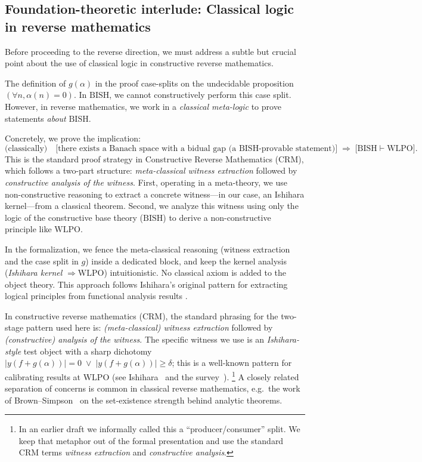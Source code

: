 \documentclass[11pt]{article}
\newcommand{\WLPO}{\mathrm{WLPO}}
\newcommand{\BISH}{\mathrm{BISH}}
\begin{document}
\subsection{Foundation-theoretic interlude: Classical logic in reverse mathematics}

Before proceeding to the reverse direction, we must address a subtle but crucial point about the use of classical logic in constructive reverse mathematics.

\begin{rem}\label{rem:meta-classical}
The definition of $g(\alpha)$ in the proof case-splits on the undecidable proposition
$(\forall n,\alpha(n)=0)$. In $\BISH$, we cannot constructively perform this case split.
However, in reverse mathematics, we work in a \emph{classical meta-logic} to prove
statements \emph{about} $\BISH$.

Concretely, we prove the implication:
\[
  \text{(classically)}\quad
  \big[\text{there exists a Banach space with a bidual gap (a $\BISH$-provable statement)}\big]
  \;\Longrightarrow\;
  \big[\BISH \vdash \WLPO\big].
\]
This is the standard proof strategy in Constructive Reverse Mathematics (CRM), which follows a two-part structure: \emph{meta-classical witness extraction} followed by \emph{constructive analysis of the witness}. First, operating in a meta-theory, we use non-constructive reasoning to extract a concrete witness---in our case, an Ishihara kernel---from a classical theorem. Second, we analyze this witness using only the logic of the constructive base theory ($\BISH$) to derive a non-constructive principle like $\WLPO$.

In the formalization, we fence the meta-classical reasoning (witness extraction and
the case split in $g$) inside a dedicated block, and keep the kernel analysis
(\emph{Ishihara kernel} $\Rightarrow \WLPO$) intuitionistic. No classical axiom
is added to the object theory. This approach follows Ishihara's original pattern for extracting logical principles from functional analysis results \cite{Ishihara90}.
\end{rem}

\begin{rem}
In constructive reverse mathematics (CRM), the standard phrasing for the two-stage pattern used here is:
\emph{(meta-classical) witness extraction} followed by \emph{(constructive) analysis of the witness}.
The specific witness we use is an \emph{Ishihara-style} test object with a sharp dichotomy
$|y(f+g(\alpha))|=0 \;\vee\; |y(f+g(\alpha))|\ge \delta$; this is a well-known pattern for calibrating results at
$\WLPO$ (see Ishihara~\cite{Ishihara90} and the survey~\cite{DienerCRM}).%
\footnote{In an earlier draft we informally called this a ``producer/consumer'' split. We keep that
metaphor out of the formal presentation and use the standard CRM terms \emph{witness extraction} and
\emph{constructive analysis}.}
A closely related separation of concerns is common in classical reverse mathematics, e.g.\ the work of
Brown--Simpson~\cite{BrownSimpson86} on the set-existence strength behind analytic theorems.
\end{rem}
\end{document}
